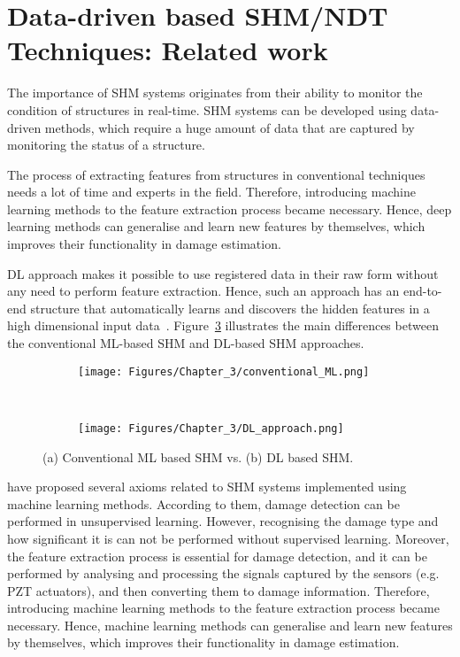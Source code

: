 \section{Data-driven based SHM/NDT Techniques: Related work}
\label{sec33}
The importance of SHM systems originates from their ability to monitor the condition of structures in real-time.
SHM systems can be developed using data-driven methods, which require a huge amount of data that are captured by monitoring the status of a structure.

The process of extracting features from structures in conventional techniques needs a lot of time and experts in the field.
Therefore, introducing machine learning methods to the feature extraction process became necessary.
Hence, deep learning methods can generalise and learn new features by themselves, which improves their functionality in damage estimation.

DL approach makes it possible to use registered data in their raw form without any need to perform feature extraction.
Hence, such an approach has an end-to-end structure that automatically learns and discovers the hidden features in a high dimensional input data~\cite{LeCun, Networks}.
Figure~\ref{fig:ML_vs_DL} illustrates the main differences between the conventional ML-based SHM and DL-based SHM approaches.

\begin{figure}[!ht]
	\centering
	\begin{subfigure}{1\textwidth}		
		\centering
		\texttt{[image: Figures/Chapter\_3/conventional\_ML.png]}
		\caption{} 
		\label{fig:ML_conventional}
	\end{subfigure}
	\\
	\begin{subfigure}{1\textwidth}
		\centering
		\texttt{[image: Figures/Chapter\_3/DL\_approach.png]}
		\caption{} 
		\label{fig:DL_approach}
	\end{subfigure}	
	\caption{(a) Conventional ML based SHM vs. (b) DL based SHM.}
	\label{fig:ML_vs_DL}
\end{figure}
\textcite{Worden2007} have proposed several axioms related to SHM systems implemented using machine learning methods. 
According to them, damage detection can be perform\-ed in unsupervised learning.
However, recognising the damage type and how significant it is can not be performed without supervised learning. 
Moreover, the feature extraction process is essential for damage detection, and it can be performed by analysing and processing the signals captured by the sensors (e.g. PZT actuators), and then converting them to damage information.
Therefore, introducing machine learning methods to the feature extraction process became necessary.
Hence, machine learning methods can generalise and learn new features by themselves, which improves their functionality in damage estimation.


